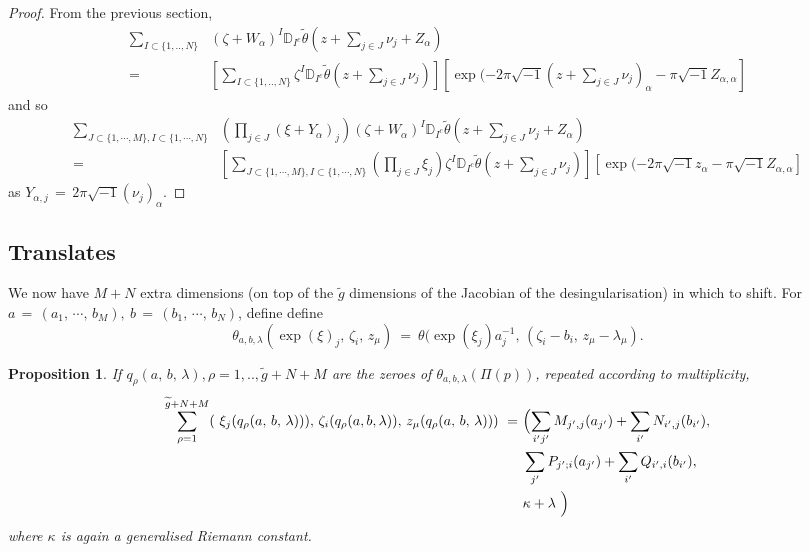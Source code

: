 \documentclass[12pt,reqno]{amsart}
\numberwithin{equation}{section}
\newtheorem{proposition}[theorem]{Proposition}
\theoremstyle{definition}
\theoremstyle{remark}
\def\bD{{\mathbb {D}}}
\def\bD{{\mathbb {D}}}
\begin{document}
\begin{proof}
From the previous section, 
\begin{align*}\sum_{I\subset\{1,..,N\}} &(\zeta +W_\alpha)^I\bD_{I^c}\widetilde{\theta}(z +\sum_{j\in J}\nu_j +Z_\alpha)  \\ =  &[\sum_{I\subset\{1,..,N\}} \zeta^I \bD_{I^c}\widetilde{\theta}(z +\sum_{j\in J}\nu_j  ) ] [\exp
(-2\pi\sqrt{-1} (z+\sum_{j\in J}\nu_j)_\alpha -\pi\sqrt{-1} Z_{\alpha,\alpha}]\end{align*}
and so
\begin{align*}\sum_{J \subset \{1,\cdots ,M\}, I\subset\{1,\cdots ,N\}}&(\prod_{j\in J} (\xi+ Y_\alpha)_j )
(\zeta +W_\alpha)^I\bD_{I^c}\widetilde{\theta}(z +\sum_{j\in J}\nu_j +Z_\alpha)   \\ 
= \ &[\sum_{J \subset \{1,\cdots ,M\}, I\subset\{1,\cdots ,N\}}(\prod_{j\in J} \xi_j ) \zeta^I\bD_{I^c}
\widetilde{\theta} (z+\sum_{j\in J}\nu_j) ][\exp (-2\pi\sqrt{-1} z_\alpha -\pi\sqrt{-1} Z_{\alpha,\alpha}]\end{align*}
as $Y_{\alpha,j}\, =\, 2\pi\sqrt{-1} (\nu_j)_{\alpha}$.
\end{proof}

 \subsection{Translates}
We now have $M+N$ extra dimensions (on top of the $\widetilde g$ dimensions of the Jacobian of the 
desingularisation) in which to shift. For $a \,=\, (a_1,\, \cdots,\,b_M),\ b \,=\, (b_1,\, \cdots,\,b_N)$, define 
define
$$\theta_{a,b,\lambda}(\exp(\xi)_j,\, \zeta_i,\, z_\mu)\ =\ \theta(\exp(\xi_j) a_j^{-1},\, (\zeta_i -b_i ,\, z_\mu-\lambda_\mu). $$
 

\begin{proposition}
If $q_\rho(a,\, b,\, \lambda), \rho = 1,..,\widetilde{g} +N +M$ are the zeroes of $\theta_{a,b,\lambda}(\Pi(p))$, repeated according to multiplicity,
\begin{align*}\sum_{\rho=1}^{\widetilde{g} +N +M} (\ \xi_j(q_\rho(a,\,b,\, \lambda))),\,\zeta_{i}(q_\rho(a, b, \lambda)),\, z_\mu(q_\rho(a,\,b,\, \lambda)))  \ =\ &    \Bigl( \sum_{i'j'} M_{j',j}(a_{j'}) + \sum_{i' }N_{i',j}(b_{i'}),\\
&  \sum_{j'} P_{j';i}(a_{j'}) + \sum_{i'}Q_{i',i}(b_{i'}), \\
& \kappa+  \lambda  \ \Bigr ) 
\end{align*}  
where $\kappa $ is again  a generalised Riemann constant.
\end{proposition}
\end{document}
